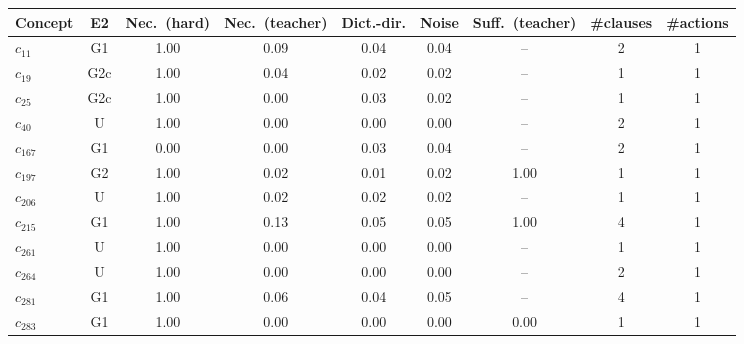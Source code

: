\begin{tabular}{lcccccccc}
\toprule
Concept & E2 & Nec.\ (hard) & Nec.\ (teacher) & Dict.-dir. & Noise & Suff.\ (teacher) & \#clauses & \#actions \\
\midrule
$c_{11}$ & G1 & 1.00 & 0.09 & 0.04 & 0.04 & -- & 2 & 1 \\
$c_{19}$ & G2c & 1.00 & 0.04 & 0.02 & 0.02 & -- & 1 & 1 \\
$c_{25}$ & G2c & 1.00 & 0.00 & 0.03 & 0.02 & -- & 1 & 1 \\
$c_{40}$ & U & 1.00 & 0.00 & 0.00 & 0.00 & -- & 2 & 1 \\
$c_{167}$ & G1 & 0.00 & 0.00 & 0.03 & 0.04 & -- & 2 & 1 \\
$c_{197}$ & G2 & 1.00 & 0.02 & 0.01 & 0.02 & 1.00 & 1 & 1 \\
$c_{206}$ & U & 1.00 & 0.02 & 0.02 & 0.02 & -- & 1 & 1 \\
$c_{215}$ & G1 & 1.00 & 0.13 & 0.05 & 0.05 & 1.00 & 4 & 1 \\
$c_{261}$ & U & 1.00 & 0.00 & 0.00 & 0.00 & -- & 1 & 1 \\
$c_{264}$ & U & 1.00 & 0.00 & 0.00 & 0.00 & -- & 2 & 1 \\
$c_{281}$ & G1 & 1.00 & 0.06 & 0.04 & 0.05 & -- & 4 & 1 \\
$c_{283}$ & G1 & 1.00 & 0.00 & 0.00 & 0.00 & 0.00 & 1 & 1 \\
\bottomrule
\end{tabular}